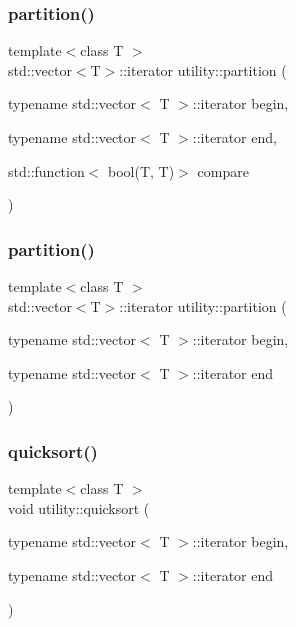 \subsubsection{\texorpdfstring{partition()}{partition()}\hspace{0.1cm}{\footnotesize\ttfamily [1/2]}}
{\footnotesize\ttfamily template$<$class T $>$ \\
std\+::vector$<$T$>$\+::iterator utility\+::partition (\begin{DoxyParamCaption}\item[{typename std\+::vector$<$ T $>$\+::iterator}]{begin,  }\item[{typename std\+::vector$<$ T $>$\+::iterator}]{end,  }\item[{std\+::function$<$ bool(T, T)$>$}]{compare }\end{DoxyParamCaption})}

\mbox{\label{namespaceutility_a43c3ec927ceecb5da5728af4842503e1}} 
\subsubsection{\texorpdfstring{partition()}{partition()}\hspace{0.1cm}{\footnotesize\ttfamily [2/2]}}
{\footnotesize\ttfamily template$<$class T $>$ \\
std\+::vector$<$T$>$\+::iterator utility\+::partition (\begin{DoxyParamCaption}\item[{typename std\+::vector$<$ T $>$\+::iterator}]{begin,  }\item[{typename std\+::vector$<$ T $>$\+::iterator}]{end }\end{DoxyParamCaption})}

\mbox{\label{namespaceutility_a44d24bc0a4d5a6b1d919f6035ae2a5dd}} 
\subsubsection{\texorpdfstring{quicksort()}{quicksort()}}
{\footnotesize\ttfamily template$<$class T $>$ \\
void utility\+::quicksort (\begin{DoxyParamCaption}\item[{typename std\+::vector$<$ T $>$\+::iterator}]{begin,  }\item[{typename std\+::vector$<$ T $>$\+::iterator}]{end }\end{DoxyParamCaption})}

